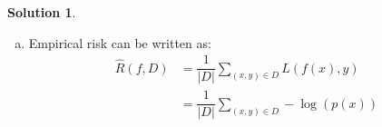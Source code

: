 \documentclass[letterpaper, 12pt]{article}
\theoremstyle{definition}
\newtheorem*{solution}{Solution}
\begin{document}
\begin{solution}
\begin{enumerate}[1.]
\begin{enumerate}[(a)]
\begin{proof}
                        \begin{equation*}
                        	\begin{split}
							p(\bm{x}) & = \frac{1}{(2\pi)^{d/2}\sqrt{det(\Sigma)}} \exp(\sum_{i=1}^{d} -\frac{1}{2 \sigma_{ii}^2}(x_i - \mu)^2) \\
                            & = \frac{1}{(2\pi)^{d/2}\sqrt{det(\Sigma)}} \prod_{i=1}^{d} \exp -\left(\frac{1}{2 \sigma_{ii}^2}(x_i - \mu)^2\right)
                            \end{split}
						\end{equation*}
                        
                        As above, we can also express the constant term in a product form, giving us  the expression for $p(\bm{x})$:
                        
						\begin{equation*}
                        	\begin{split}
								p(\bm{x}) & = \prod_{i=1}^{d} \frac{1}{(2\pi \sigma_{ii}^2)^{1/2} } \prod_{i=1}^{d} \exp (-\frac{1}{2 \sigma_{ii}^2}(x_i - \mu)^2) \\
                                & = \prod_{i=1}^{d} \frac{1}{(2\pi \sigma_{ii}^2)^{1/2} } \exp (-\frac{1}{2 \sigma_{ii}^2}(x_i - \mu)^2) 
                            \end{split}
						\end{equation*}
                        
                        	Note that $\dfrac{1}{(2\pi \sigma_{ii}^2)^{1/2} } \exp (\dfrac{1}{2 \sigma_{ii}^2}(x_i - \mu)^2)$ is a Gaussian with parameters $\mathcal{N}(\mu, \sigma_{ii})$.

						Thus, we have:

						\begin{equation*}
							p(\bm{x}) = \prod_{i =1}^{d} \mathcal{N}(\mu, \sigma_{ii})
						\end{equation*}
                    
                    Therefore, the diagonal Gaussian density function is equal to the product of the individual components' density functions, and the individual components are independent.
                    \end{proof}
                    
                    
            	\item Empirical risk can be written as:
                	\begin{equation*}
                    	\begin{split}
							\hat{R}(f, D) & = \dfrac{1}{|D|} \sum_{(x, y) \in D} L(f(x), y) \\
                            & = \dfrac{1}{|D|} \sum_{(x, y) \in D} -\log(p(x))
						\end{split}
                    \end{equation*}
                    

\end{enumerate}
\end{enumerate}
\end{solution}
\end{document}
